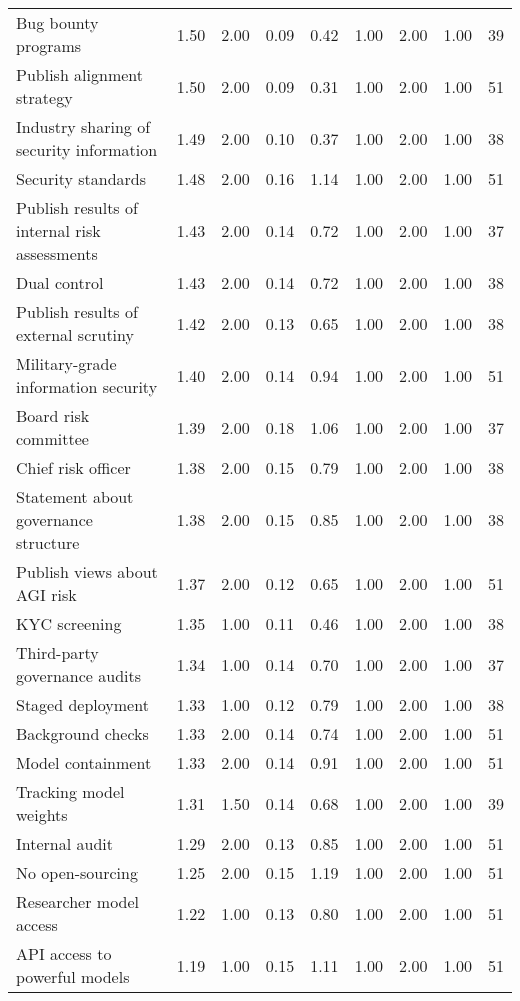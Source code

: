 \documentclass{article}
\begin{document}
\begin{sidewaystable}
\begin{adjustbox}{width=\textwidth, center}
\begin{tabular}{l r r r r r r r r}
Bug bounty programs & 1.50 & 2.00 & 0.09 & 0.42 & 1.00 & 2.00 & 1.00 & 39 \\
Publish alignment strategy & 1.50 & 2.00 & 0.09 & 0.31 & 1.00 & 2.00 & 1.00 & 51 \\
Industry sharing of security information & 1.49 & 2.00 & 0.10 & 0.37 & 1.00 & 2.00 & 1.00 & 38 \\
Security standards & 1.48 & 2.00 & 0.16 & 1.14 & 1.00 & 2.00 & 1.00 & 51 \\
Publish results of internal risk assessments & 1.43 & 2.00 & 0.14 & 0.72 & 1.00 & 2.00 & 1.00 & 37 \\
Dual control & 1.43 & 2.00 & 0.14 & 0.72 & 1.00 & 2.00 & 1.00 & 38 \\
Publish results of external scrutiny & 1.42 & 2.00 & 0.13 & 0.65 & 1.00 & 2.00 & 1.00 & 38 \\
Military-grade information security & 1.40 & 2.00 & 0.14 & 0.94 & 1.00 & 2.00 & 1.00 & 51 \\
Board risk committee & 1.39 & 2.00 & 0.18 & 1.06 & 1.00 & 2.00 & 1.00 & 37 \\
Chief risk officer & 1.38 & 2.00 & 0.15 & 0.79 & 1.00 & 2.00 & 1.00 & 38 \\
Statement about governance structure & 1.38 & 2.00 & 0.15 & 0.85 & 1.00 & 2.00 & 1.00 & 38 \\
Publish views about AGI risk & 1.37 & 2.00 & 0.12 & 0.65 & 1.00 & 2.00 & 1.00 & 51 \\
KYC screening & 1.35 & 1.00 & 0.11 & 0.46 & 1.00 & 2.00 & 1.00 & 38 \\
Third-party governance audits & 1.34 & 1.00 & 0.14 & 0.70 & 1.00 & 2.00 & 1.00 & 37 \\
Staged deployment & 1.33 & 1.00 & 0.12 & 0.79 & 1.00 & 2.00 & 1.00 & 38 \\
Background checks & 1.33 & 2.00 & 0.14 & 0.74 & 1.00 & 2.00 & 1.00 & 51 \\
Model containment & 1.33 & 2.00 & 0.14 & 0.91 & 1.00 & 2.00 & 1.00 & 51 \\
Tracking model weights & 1.31 & 1.50 & 0.14 & 0.68 & 1.00 & 2.00 & 1.00 & 39 \\
Internal audit & 1.29 & 2.00 & 0.13 & 0.85 & 1.00 & 2.00 & 1.00 & 51 \\
No open-sourcing & 1.25 & 2.00 & 0.15 & 1.19 & 1.00 & 2.00 & 1.00 & 51 \\
Researcher model access & 1.22 & 1.00 & 0.13 & 0.80 & 1.00 & 2.00 & 1.00 & 51 \\
API access to powerful models & 1.19 & 1.00 & 0.15 & 1.11 & 1.00 & 2.00 & 1.00 & 51 \\

\end{tabular}
\end{adjustbox}
\end{sidewaystable}
\end{document}
